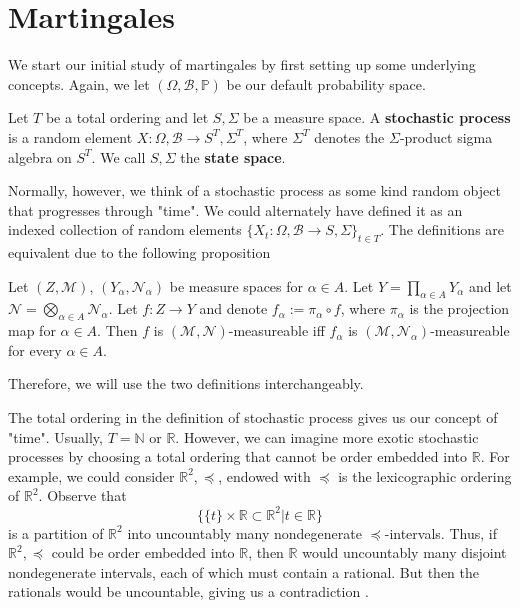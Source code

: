 \section{Martingales}
\label{stoch:martingales}

We start our initial study of martingales by first setting up some underlying concepts. Again, we let \((\Omega, \mathcal{B}, \mathbb{P})\) be our default probability space.

\begin{definition}
    Let \(T\) be a total ordering and let \(S, \Sigma\) be a measure space. A \textbf{stochastic process} is a random element \(X: \Omega, \mathcal{B} \to S^{T}, \Sigma^{T}\), where \(\Sigma^{T}\) denotes the \(\Sigma\)-product sigma algebra on \(S^{T}\). We call \(S, \Sigma\) the \textbf{state space}.
\end{definition}

Normally, however, we think of a stochastic process as some kind random object that progresses through "time". We could alternately have defined it as an indexed collection of random elements \(\{X_{t}: \Omega, \mathcal{B} \to S, \Sigma\}_{t \in T}\). The definitions are equivalent due to the following proposition

\begin{proposition}
    Let \((Z, \mathcal{M})\), $(Y_{\alpha}, \mathcal{N}_\alpha)$ be measure spaces for $\alpha \in A$. Let $Y = \prod\limits_{\alpha \in A} Y_\alpha$ and let $\mathcal{N} = \bigotimes\limits_{\alpha \in A} \mathcal{N}_\alpha$. Let $f : Z \to Y$ and denote $f_{\alpha} := \pi_{\alpha} \circ f$, where $\pi_\alpha$ is the projection map for $\alpha \in A$. Then $f$ is $(\mathcal{M}, \mathcal{N})$-measureable iff $f_\alpha$ is $(\mathcal{M}, \mathcal{N}_\alpha)$-measureable for every $\alpha \in A$.
\end{proposition}

Therefore, we will use the two definitions interchangeably.

The total ordering in the definition of stochastic process gives us our concept of "time". Usually, \(T = \mathbb{N}\) or \(\mathbb{R}\). However, we can imagine more exotic stochastic processes by choosing a total ordering that cannot be order embedded into \(\mathbb{R}\). For example, we could consider \(\mathbb{R}^{2}, \preccurlyeq\), endowed with \(\preccurlyeq\) is the lexicographic ordering of \(\mathbb{R}^{2}\). Observe that 
\[\{\{t\} \times \mathbb{R} \subset \mathbb{R}^{2} | t \in \mathbb{R}\}\]
is a partition of \(\mathbb{R}^{2}\) into uncountably many nondegenerate \(\preccurlyeq\)-intervals. Thus, if \(\mathbb{R}^{2}, \preccurlyeq\) could be order embedded into \(\mathbb{R}\), then \(\mathbb{R}\) would uncountably many disjoint nondegenerate intervals, each of which must contain a rational. But then the rationals would be uncountable, giving us a contradiction \cite{exotic_order}.

